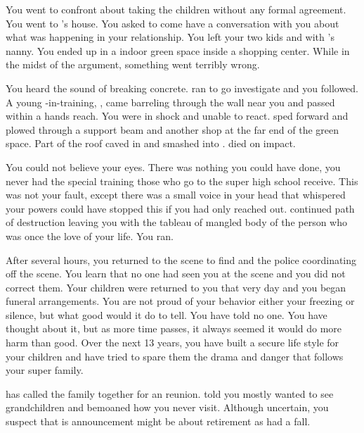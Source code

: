\documentclass[char]{LRSguildcamp1}
\begin{document}
You went to confront \cAS{} about taking the children without any formal agreement. You went to \cOS{}'s house. You asked \cAS{} to come have a conversation with you about what was happening in your relationship. You left your two kids and \cGrad{} with \cGrad{}'s nanny. You ended up in a indoor green space inside a shopping center. While in the midst of the argument, something went terribly wrong.

You heard the sound of breaking concrete. \cAS{} ran to go investigate and you followed. A young \cJuggernaut{\hero}-in-training, \cJuggernaut{}, came barreling through the wall near you and passed within a hands reach. You were in shock and unable to react.\cJuggernaut{} sped forward and plowed through a support beam and another shop at the far end of the green space. Part of the roof caved in and smashed into \cAS{}. \cAS{\They} died on impact. 

You could not believe your eyes. There was nothing you could have done, you never had the special training those who go to the super high school receive. This was not your fault, except there was a small voice in your head that whispered your powers could have stopped this if you had only reached out. \cJuggernaut{} continued \cJuggernaut{\their} path of destruction leaving you with the tableau of mangled body of the person who was once the love of your life. You ran. 

After several hours, you returned to the scene to find \cOS{} and the police coordinating off the scene. You learn that no one had seen you at the scene and you did not correct them. Your children were returned to you that very day and you began funeral arrangements. You are not proud of your behavior either your freezing or silence, but what good would it do to tell. You have told no one. You have thought about it, but as more time passes, it always seemed it would do more harm than good. Over the next 13 years, you have built a secure life style for your children and have tried to spare them the drama and danger that follows your super family. 

\cGrandma{} has called the family together for an reunion. \cGrandma{\They} told you mostly \cGrandma{\they} wanted to see \cGrandma{\their} grandchildren and bemoaned how you never visit. Although uncertain, you suspect that is announcement might be about \cGrandma{\their} retirement as  had a fall.
\end{document}
